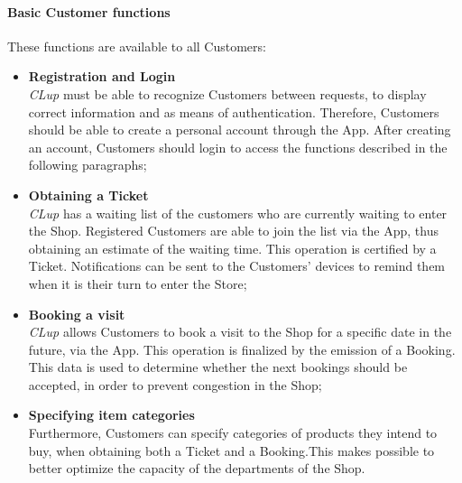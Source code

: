 \paragraph{Basic Customer functions} These functions are available to all Customers:
\begin{itemize}
    \item \textbf{Registration and Login}\\
          \emph{CLup} must be able to recognize Customers between requests, to display correct information and as means of authentication. Therefore, Customers should be able to create a personal account through the App. After creating an account, Customers should login to access the functions described in the following paragraphs;
    \item \textbf{Obtaining a Ticket}\\
          \emph{CLup} has a waiting list of the customers who are currently waiting to enter the Shop. Registered Customers are able to join the list via the App, thus obtaining an estimate of the waiting time. This operation is certified by a Ticket. Notifications can be sent to the Customers' devices to remind them when it is their turn to enter the Store;
    \item \textbf{Booking a visit}\\
          \emph{CLup} allows Customers to book a visit to the Shop for a specific date in the future, via the App. This operation is finalized by the emission of a Booking. This data is used to determine whether the next bookings should be accepted, in order to prevent congestion in the Shop;
    \item \textbf{Specifying item categories}\\
          Furthermore, Customers can specify categories of products they intend to buy, when obtaining both a Ticket and a Booking.This makes possible to better optimize the capacity of the departments of the Shop.
\end{itemize}

